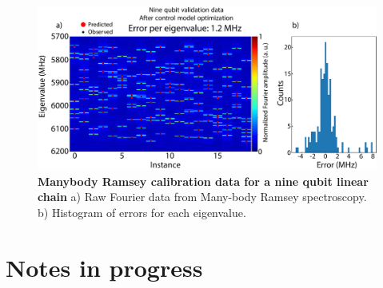 \begin{figure}[h]
    \begin{center}
        \includegraphics[width=150 mm]{./PDF/mbr_9q_validation.pdf}
        \caption{\textbf{Manybody Ramsey calibration data for a nine qubit linear chain}
        a) Raw Fourier data from Many-body Ramsey spectroscopy.  b) Histogram of errors for each eigenvalue.
        }
    \end{center}
\end{figure}

\section{Notes in progress}

